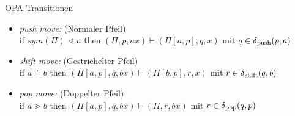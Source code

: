 \documentclass[
10pt,
pantone315, 	%
]{beamer}
\begin{document}
\begin{frame}[t]{OPA Transitionen}
	\begin{itemize}[<+->]
		\item
		\textit{push move:} (Normaler Pfeil) \\
		if $sym(\Pi) \lessdot a$ then $(\Pi, p, ax) \vdash (\Pi\left[a, p \right], q, x)$ mit 
		$q \in \delta \textsubscript{push} (p,a)$
		\item
		\textit{shift move: } (Gestrichelter Pfeil) \\
		if $a \doteq b$ then $(\Pi\left[a, p \right], q, bx) \vdash (\Pi \left[ b, p \right], r, x)$ mit 
		$r \in \delta \textsubscript{shift} (q, b)$
		\item
		\textit{pop move: } (Doppelter Pfeil) \\
		if $ a \gtrdot b$ then $(\Pi\left[a, p\right], q, bx) \vdash (\Pi, r, bx)$ mit $r \in \delta \textsubscript{pop} (q,p)$
	
	\end{itemize}
\end{frame}
\end{document}
